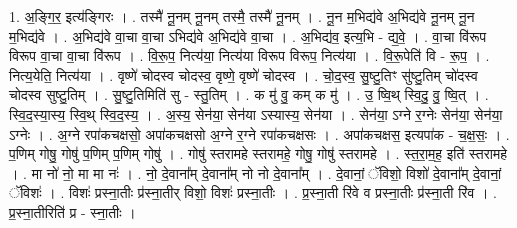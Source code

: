 \documentclass[17pt]{extarticle}
\begin{document}
1. अ॒ङ्‍गि॒र॒ इत्य॑ङ्‍गिरः । . तस्मै॑ नू॒नम् नू॒नम् तस्मै॒ तस्मै॑ नू॒नम् । . नू॒न म॒भिद्य॑वे अ॒भिद्य॑वे नू॒नम् नू॒न म॒भिद्य॑वे । . अ॒भिद्य॑वे वा॒चा वा॒चा ऽभिद्य॑वे अ॒भिद्य॑वे वा॒चा । . अ॒भिद्य॑व॒ इत्य॒भि - द्य॒वे॒ । . वा॒चा वि॑रूप विरूप वा॒चा वा॒चा वि॑रूप । . वि॒रू॒प॒ नित्य॑या॒ नित्य॑या विरूप विरूप॒ नित्य॑या । . वि॒रू॒पेति॑ वि - रू॒प॒ । . नित्य॒येति॒ नित्य॑या । . वृष्णे॑ चोदस्व चोदस्व॒ वृष्णे॒ वृष्णे॑ चोदस्व । . चो॒द॒स्व॒ सु॒ष्टु॒तिꣳ सु॑ष्टु॒तिम् चो॑दस्व चोदस्व सुष्टु॒तिम् । . सु॒ष्टु॒तिमिति॑ सु - स्तु॒तिम् । . क मु॑ वु॒ कम् क मु॑ । . उ॒ ष्वि॒थ् स्वि॒दु॒ वु॒ ष्वि॒त् । . स्वि॒द॒स्या॒स्य॒ स्वि॒थ् स्वि॒द॒स्य॒ । . अ॒स्य॒ सेन॑या॒ सेन॑या ऽस्यास्य॒ सेन॑या । . सेन॑या॒ ऽग्ने र॒ग्नेः सेन॑या॒ सेन॑या॒ ऽग्नेः । . अ॒ग्ने रपा॑कचक्षसो॒ अपा॑कचक्षसो अ॒ग्ने र॒ग्ने रपा॑कचक्षसः । . अपा॑कचक्षस॒ इत्यपा॑क - च॒क्ष॒सः॒ । . प॒णिम् गोषु॒ गोषु॑ प॒णिम् प॒णिम् गोषु॑ । . गोषु॑ स्तरामहे स्तरामहे॒ गोषु॒ गोषु॑ स्तरामहे । . स्त॒रा॒म॒ह॒ इति॑ स्तरामहे । . मा नो॑ नो॒ मा मा नः॑ । . नो॒ दे॒वाना᳚म् दे॒वाना᳚म् नो नो दे॒वाना᳚म् । . दे॒वानां॒ ॅविशो॒ विशो॑ दे॒वाना᳚म् दे॒वानां॒ ॅविशः॑ । . विशः॑ प्रस्ना॒तीः प्र॑स्ना॒तीर् विशो॒ विशः॑ प्रस्ना॒तीः । . प्र॒स्ना॒ती रि॑वे व प्रस्ना॒तीः प्र॑स्ना॒ती रि॑व । . प्र॒स्ना॒तीरिति॑ प्र - स्ना॒तीः । \newline
\end{document}
